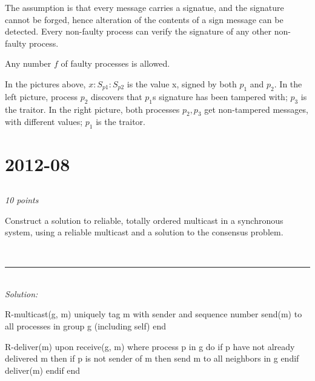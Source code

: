 \documentclass[a4paper]{article}
\newcommand{\horrule}[1]{\rule{\linewidth}{#1}} %
\newcommand{\points}[1]{\subsection{} \textit{#1 points}\\}
\newcommand{\question}[2][]{
  \noindent
  \parbox[t]{\textwidth}{#1 \parbox[t]{0.95\textwidth}{#2}}\\
}
\newcommand{\solution}[1]{\horrule{0.5pt}\\[3pt]\textit{Solution: }\\\begin{minipage}{\textwidth}#1\end{minipage}}
\begin{document}
{  The assumption is that every message carries a signatue, and the
  signature cannot be forged, hence alteration of the contents of a
  sign message can be detected. Every non-faulty process can verify
  the signature of any other non-faulty process.

  Any number $f$ of faulty processes is allowed.

  \begin{minipage}{0.45\linewidth}
  \end{minipage}
  \begin{minipage}{0.45\linewidth}
  \end{minipage}

  In the pictures above, $x:S_{p1}:S_{p2}$ is the value x, signed by
  both $p_1$ and $p_2$. In the left picture, process $p_2$ discovers
  that $p_1$s signature has been tampered with; $p_3$ is the traitor.
  In the right picture, both processes $p_2, p_3$ get non-tampered
  messages, with different values; $p_1$ is the traitor.
}

\section{2012-08}
\points{10}
\question{
  Construct a solution to reliable, totally ordered multicast
  in a synchronous system, using a reliable multicast and a solution
  to the consensus problem.
}
\solution{
  R-multicast(g, m)
    uniquely tag m with sender and sequence number
    send(m) to all processes in group g (including self)
  end

  R-deliver(m)
  upon receive(g, m) where process p in g do
  if p have not already delivered m
  then if p is not sender of m
  then send m to all neighbors in g
  endif
  deliver(m)
  endif
  end
}
\end{document}
